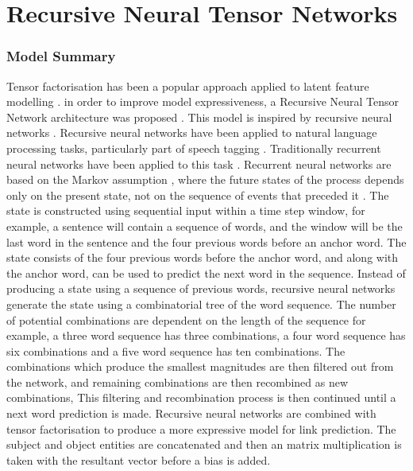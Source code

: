 \section{Recursive Neural Tensor Networks}
\subsubsection{Model Summary} 
Tensor factorisation has been a popular approach applied to latent feature modelling \cite{reference, reference, reference}. in order to improve model expressiveness, a Recursive Neural Tensor Network architecture was proposed \cite{reference}. This model is inspired by recursive neural networks \cite{reference}. Recursive neural networks have been applied to natural language processing tasks, particularly part of speech tagging \cite{reference}. Traditionally recurrent neural networks have been applied to this task \cite{reference}. Recurrent neural networks are based on the Markov assumption \cite{reference}, where the future states of the process depends only on the present state, not on the sequence of events that preceded it \cite{reference}. The state is constructed using sequential input within a time step window, for example, a sentence will contain a sequence of words, and the window will be the last word in the sentence and the four previous words before an anchor word. The state consists of the four previous words before the anchor word, and along with the anchor word, can be used to predict the next word in the sequence.\newline
Instead of producing a state using a sequence of previous words, recursive neural networks generate the state using a combinatorial tree of the word sequence. The number of potential combinations are dependent on the length of the sequence for example, a three word sequence has three combinations, a four word sequence has six combinations and  a five word sequence has ten combinations. The combinations which produce the smallest magnitudes are then filtered out from the network, and remaining combinations are then recombined as new combinations, This filtering and recombination process is then continued until a next word prediction is made. \newline
Recursive neural networks are combined with tensor factorisation to produce a more expressive model for link prediction. The subject and object entities are concatenated and then an matrix multiplication is taken with the resultant vector before a bias is added. \newline
